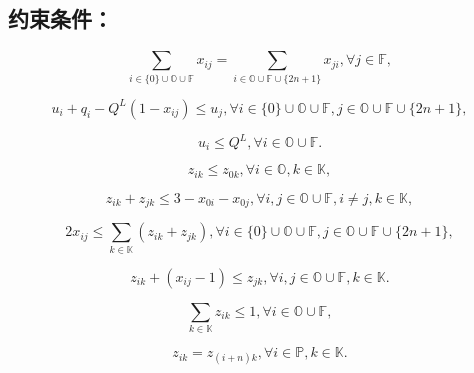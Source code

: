 \documentclass[11pt]{ctexart}
\begin{document}
\subsection{约束条件：}
\begin{equation}
    \label{eq:5}
    \sum_{i \in \{0\} \cup \mathbb{O} \cup \mathbb{F}} x_{ij} = \sum_{i \in \mathbb{O} \cup \mathbb{F} \cup \{2n+1\}} x_{ji}, \forall j \in \mathbb{F}, \tag{5}
\end{equation}

\begin{equation}
    \label{eq:6}
    u_i + q_i - Q^L(1 - x_{ij}) \le u_j, \forall i \in \{0\} \cup \mathbb{O} \cup \mathbb{F}, j \in \mathbb{O} \cup \mathbb{F} \cup \{2n+1\}, \tag{6}
\end{equation}

\begin{equation}
    \label{eq:7}
    u_i \le Q^L, \forall i \in \mathbb{O} \cup \mathbb{F}. \tag{7}
\end{equation}

\begin{equation}
    \label{eq:8}
    z_{ik} \le z_{0k}, \forall i \in \mathbb{O}, k \in \mathbb{K}, \tag{8}
\end{equation}

\begin{equation}
    \label{eq:9}
    z_{ik} + z_{jk} \le 3 - x_{0i} - x_{0j}, \forall i, j \in \mathbb{O} \cup \mathbb{F}, i\ne j, k \in \mathbb{K}, \tag{9}
\end{equation}

\begin{equation}
    \label{eq:10}
    2x_{ij} \le \sum_{k \in \mathbb{K}} (z_{ik} + z_{jk}), \forall i \in \{0\} \cup \mathbb{O} \cup \mathbb{F}, j \in \mathbb{O} \cup \mathbb{F} \cup \{2n + 1\}, \tag{10}
\end{equation}

\begin{equation}
    \label{eq:11}
    z_{ik} + (x_{ij} - 1) \le z_{jk}, \forall i, j \in \mathbb{O} \cup \mathbb{F}, k \in \mathbb{K}. \tag{11}
\end{equation}

\begin{equation}
    \label{eq:12}
    \sum_{k \in \mathbb{K}} z_{ik} \le 1, \forall i \in \mathbb{O} \cup \mathbb{F}, \tag{12}
\end{equation}

\begin{equation}
    \label{eq:13}
    z_{ik} = z_{(i+n)k}, \forall i \in \mathbb{P}, k \in \mathbb{K}. \tag{13}
\end{equation}
\end{document}
